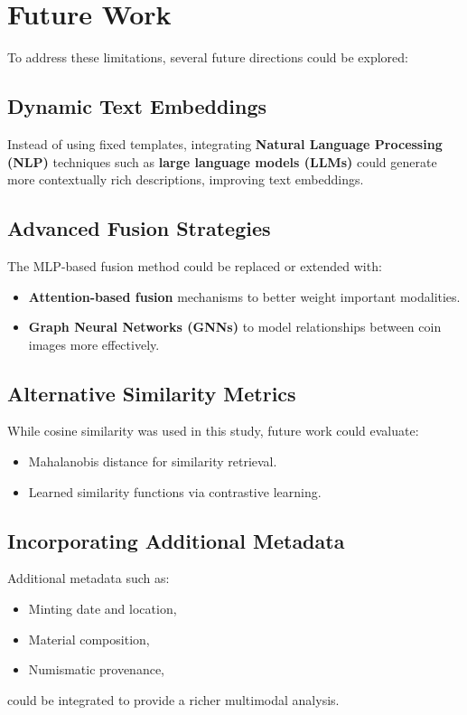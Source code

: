 \documentclass[nolibertine, english, algorithm, nomencl, minted]{ttlab-qualify}
\begin{document}
\section{Future Work}
\label{sec:future_work}

To address these limitations, several future directions could be explored:

\subsection{Dynamic Text Embeddings}
Instead of using fixed templates, integrating \textbf{Natural Language Processing (NLP)} techniques such 
as \textbf{large language models (LLMs)} could generate more contextually rich descriptions, improving text embeddings.

\subsection{Advanced Fusion Strategies}
The MLP-based fusion method could be replaced or extended with:
\begin{itemize}
    \item \textbf{Attention-based fusion} mechanisms to better weight important modalities.
    \item \textbf{Graph Neural Networks (GNNs)} to model relationships between coin images more effectively.
\end{itemize}

\subsection{Alternative Similarity Metrics}
While cosine similarity was used in this study, future work could evaluate:
\begin{itemize}
    \item Mahalanobis distance for similarity retrieval.
    \item Learned similarity functions via contrastive learning.
\end{itemize}

\subsection{Incorporating Additional Metadata}
Additional metadata such as:
\begin{itemize}
    \item Minting date and location,
    \item Material composition,
    \item Numismatic provenance,
\end{itemize}
could be integrated to provide a richer multimodal analysis.
\end{document}
